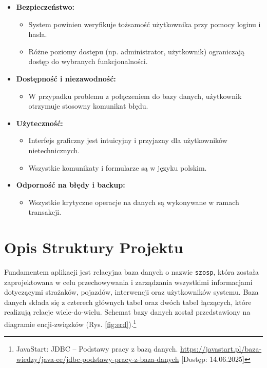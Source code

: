 \begin{itemize}
    \item \textbf{Bezpieczeństwo:}
    \begin{itemize}
        \item System powinien weryfikuje tożsamość użytkownika przy pomocy loginu i hasła.
        \item Różne poziomy dostępu (np. administrator, użytkownik) ograniczają dostęp do wybranych funkcjonalności.
    \end{itemize}

    \item \textbf{Dostępność i niezawodność:}
    \begin{itemize}
        \item W przypadku problemu z połączeniem do bazy danych, użytkownik otrzymuje stosowny komunikat błędu.
    \end{itemize}

    \item \textbf{Użyteczność:}
    \begin{itemize}
        \item Interfejs graficzny jest intuicyjny i przyjazny dla użytkowników nietechnicznych.
        \item Wszystkie komunikaty i formularze są w języku polskim.
    \end{itemize}

    \item \textbf{Odporność na błędy i backup:}
    \begin{itemize}
        \item Wszystkie krytyczne operacje na danych są wykonywane w ramach transakcji.
    \end{itemize}
\end{itemize}



\chapter{Opis Struktury Projektu}
\label{chap:baza_danych}

Fundamentem aplikacji jest relacyjna baza danych o nazwie \texttt{szosp}, która została zaprojektowana w celu przechowywania i zarządzania wszystkimi informacjami dotyczącymi strażaków, pojazdów, interwencji oraz użytkowników systemu. Baza danych składa się z czterech głównych tabel oraz dwóch tabel łączących, które realizują relacje wiele-do-wielu. Schemat bazy danych został przedstawiony na diagramie encji-związków (Rys. \ref{fig:erd}).\footnote{JavaStart: JDBC – Podstawy pracy z bazą danych. \url{https://javastart.pl/baza-wiedzy/java-ee/jdbc-podstawy-pracy-z-baza-danych} [Dostęp: 14.06.2025]}


